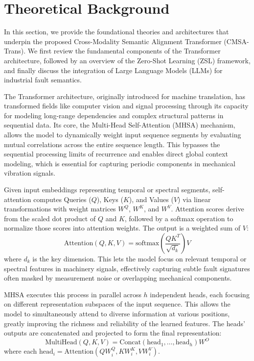 \documentclass[journal]{IEEEtran}
\begin{document}
\section{Theoretical Background}
In this section, we provide the foundational theories and architectures that underpin the proposed Cross-Modality Semantic Alignment Transformer (CMSA-Trans). We first review the fundamental components of the Transformer architecture, followed by an overview of the Zero-Shot Learning (ZSL) framework, and finally discuss the integration of Large Language Models (LLMs) for industrial fault semantics.

The Transformer architecture, originally introduced for machine translation, has transformed fields like computer vision and signal processing through its capacity for modeling long-range dependencies and complex structural patterns in sequential data. Its core, the Multi-Head Self-Attention (MHSA) mechanism, allows the model to dynamically weight input sequence segments by evaluating mutual correlations across the entire sequence length. This bypasses the sequential processing limits of recurrence and enables direct global context modeling, which is essential for capturing periodic components in mechanical vibration signals.

Given input embeddings representing temporal or spectral segments, self-attention computes Queries ($Q$), Keys ($K$), and Values ($V$) via linear transformations with weight matrices $W^Q$, $W^K$, and $W^V$. Attention scores derive from the scaled dot product of $Q$ and $K$, followed by a softmax operation to normalize those scores into attention weights. The output is a weighted sum of $V$:
\begin{equation}
\text{Attention}(Q, K, V) = \text{softmax}\left(\frac{QK^T}{\sqrt{d_k}}\right)V
\end{equation}
where $d_k$ is the key dimension. This lets the model focus on relevant temporal or spectral features in machinery signals, effectively capturing subtle fault signatures often masked by measurement noise or overlapping mechanical components.

MHSA executes this process in parallel across $h$ independent heads, each focusing on different representation subspaces of the input sequence. This allows the model to simultaneously attend to diverse information at various positions, greatly improving the richness and reliability of the learned features. The heads' outputs are concatenated and projected to form the final representation:
\begin{equation}
\text{MultiHead}(Q, K, V) = \text{Concat}(\text{head}_1, \dots, \text{head}_h)W^O
\end{equation}
where each $\text{head}_i = \text{Attention}(QW_i^Q, KW_i^K, VW_i^V)$.
\end{document}
